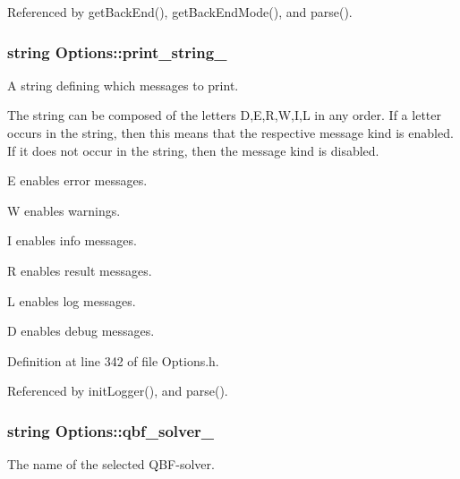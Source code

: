 Referenced by get\-Back\-End(), get\-Back\-End\-Mode(), and parse().

\hypertarget{classOptions_a6a29a69625b7962036c8c39746afc5c3}{
\subsubsection[{print\-\_\-string\-\_\-}]{\setlength{\rightskip}{0pt plus 5cm}string Options\-::print\-\_\-string\-\_\-\hspace{0.3cm}{\ttfamily [protected]}}}\label{classOptions_a6a29a69625b7962036c8c39746afc5c3}


A string defining which messages to print. 

The string can be composed of the letters D,E,R,W,I,L in any order. If a letter occurs in the string, then this means that the respective message kind is enabled. If it does not occur in the string, then the message kind is disabled. 
\begin{DoxyItemize}
\item E enables error messages. 
\item W enables warnings. 
\item I enables info messages. 
\item R enables result messages. 
\item L enables log messages. 
\item D enables debug messages. 
\end{DoxyItemize}

Definition at line 342 of file Options.\-h.



Referenced by init\-Logger(), and parse().

\hypertarget{classOptions_a07391a51f78315a8e8d2ecbeb8f57ddd}{
\subsubsection[{qbf\-\_\-solver\-\_\-}]{\setlength{\rightskip}{0pt plus 5cm}string Options\-::qbf\-\_\-solver\-\_\-\hspace{0.3cm}{\ttfamily [protected]}}}\label{classOptions_a07391a51f78315a8e8d2ecbeb8f57ddd}


The name of the selected Q\-B\-F-\/solver. 



